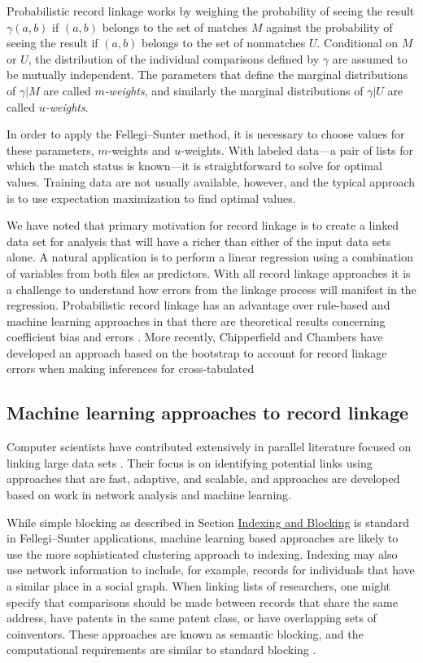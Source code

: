 \documentclass[]{krantz}
\begin{document}
Probabilistic record linkage works by weighing the probability of seeing
the result \(\gamma(a, b)\) if \((a, b)\) belongs to the set of matches
\(M\) against the probability of seeing the result if \((a, b)\) belongs
to the set of nonmatches \(U\). Conditional on \(M\) or \(U\), the
distribution of the individual comparisons defined by \(\gamma\) are
assumed to be mutually independent. The parameters that define the
marginal distributions of \(\gamma | M\) are called
\emph{\(m\)-weights}, and similarly the marginal distributions of
\(\gamma | U\) are called \emph{\(u\)-weights}.

In order to apply the Fellegi--Sunter method, it is necessary to choose
values for these parameters, \(m\)-weights and \(u\)-weights. With
labeled data---a pair of lists for which the match status is known---it
is straightforward to solve for optimal values. Training data are not
usually available, however, and the typical approach is to use
expectation maximization to find optimal values.

We have noted that primary motivation for record linkage is to create a
linked data set for analysis that will have a richer than either of the
input data sets alone. A natural application is to perform a linear
regression using a combination of variables from both files as
predictors. With all record linkage approaches it is a challenge to
understand how errors from the linkage process will manifest in the
regression. Probabilistic record linkage has an advantage over
rule-based and machine learning approaches in that there are theoretical
results concerning coefficient bias and errors
\citep{scheuren1993regression, lahiri2005regression}. More recently,
Chipperfield and Chambers have developed an approach based on the
bootstrap to account for record linkage errors when making inferences
for cross-tabulated

\subsection{Machine learning approaches to record
linkage}\label{machine-learning-approaches-to-record-linkage}

Computer scientists have contributed extensively in parallel literature
focused on linking large data sets \citep{christen2012data}. Their focus
is on identifying potential links using approaches that are fast,
adaptive, and scalable, and approaches are developed based on work in
network analysis and machine learning.

While simple blocking as described in Section
\protect\hyperlink{S:indexing}{Indexing and Blocking} is standard in
Fellegi--Sunter applications, machine learning based approaches are
likely to use the more sophisticated clustering approach to indexing.
Indexing may also use network information to include, for example,
records for individuals that have a similar place in a social graph.
When linking lists of researchers, one might specify that comparisons
should be made between records that share the same address, have patents
in the same patent class, or have overlapping sets of coinventors. These
approaches are known as semantic blocking, and the computational
requirements are similar to standard blocking \citep{christen2012data}.
\end{document}
